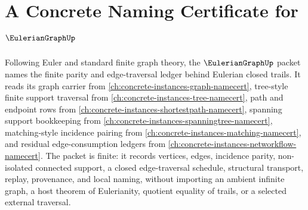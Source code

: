 \chapter{A Concrete Naming Certificate for $\EulerianGraphUp$}
\label{ch:concrete-instances-eulerian-graph-namecert}

Following Euler and standard finite graph theory, the $\EulerianGraphUp$ packet names the finite parity and edge-traversal ledger behind Eulerian closed trails. It reads its graph carrier from \autoref{ch:concrete-instances-graph-namecert}, tree-style finite support traversal from \autoref{ch:concrete-instances-tree-namecert}, path and endpoint rows from \autoref{ch:concrete-instances-shortestpath-namecert}, spanning support bookkeeping from \autoref{ch:concrete-instances-spanningtree-namecert}, matching-style incidence pairing from \autoref{ch:concrete-instances-matching-namecert}, and residual edge-consumption ledgers from \autoref{ch:concrete-instances-networkflow-namecert}. The packet is finite: it records vertices, edges, incidence parity, non-isolated connected support, a closed edge-traversal schedule, structural transport, replay, provenance, and local naming, without importing an ambient infinite graph, a host theorem of Eulerianity, quotient equality of trails, or a selected external traversal.

